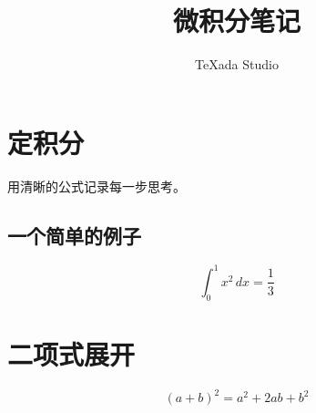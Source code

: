 \documentclass[UTF8,fontset=fandol]{ctexart}
\title{微积分笔记}
\author{TeXada Studio}
\date{}
\begin{document}
\maketitle

\section{定积分}
用清晰的公式记录每一步思考。

\subsection{一个简单的例子}
\[
  \int_0^1 x^2\,dx = \frac{1}{3}
\]

\section{二项式展开}
\begin{equation}
  (a+b)^2 = a^2 + 2ab + b^2
\end{equation}

\end{document}
